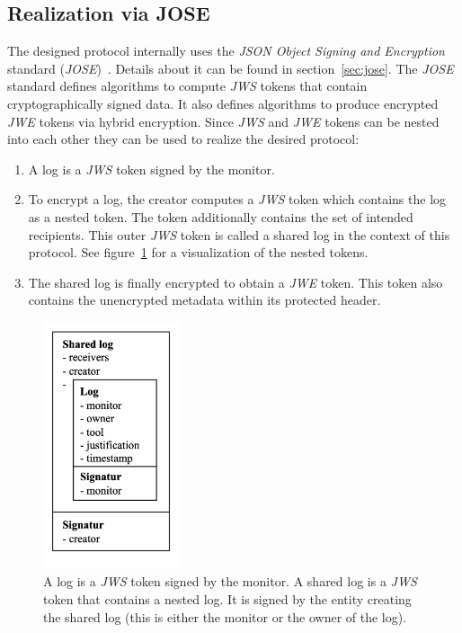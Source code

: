 \documentclass[../main.tex]{subfiles}
\begin{document}
\subsection{Realization via JOSE}
\label{sec:jose-protocol}

The designed protocol internally uses the \textit{JSON Object Signing and Encryption} standard (\textit{JOSE})~\cite{Barnes2014}.
Details about it can be found in section~\ref{sec:jose}.
The \textit{JOSE} standard defines algorithms to compute \textit{JWS} tokens that contain cryptographically signed data.
It also defines algorithms to produce encrypted \textit{JWE} tokens via hybrid encryption.
Since \textit{JWS} and \textit{JWE} tokens can be nested into each other they can be used to realize the desired protocol:
\begin{enumerate}
    \item 
    A log is a \textit{JWS} token signed by the monitor.
    \item 
    To encrypt a log, the creator computes a \textit{JWS} token which contains the log as a nested token.
    The token additionally contains the set of intended recipients.
    This outer \textit{JWS} token is called a shared log in the context of this protocol.
    See figure~\ref{fig:nested-jws} for a visualization of the nested tokens.
    \item
    The shared log is finally encrypted to obtain a \textit{JWE} token.
    This token also contains the unencrypted metadata within its protected header.
\end{enumerate}


\begin{figure}[h!]
    \includegraphics[width=4cm]{../img/05/nested_jws.jpg}
    \centering
    \caption{A log is a \textit{JWS} token signed by the monitor. A shared log is a \textit{JWS} token that contains a nested log. It is signed by the entity creating the shared log (this is either the monitor or the owner of the log).}
    \label{fig:nested-jws}
\end{figure}
\end{document}
